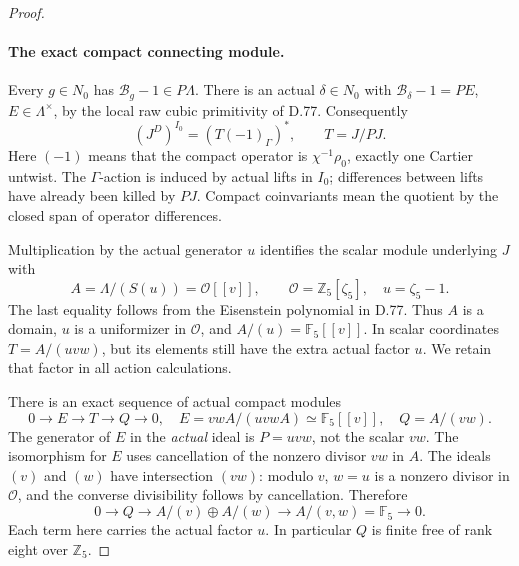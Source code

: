 \begin{proof}
\paragraph{The exact compact connecting module.}
Every \(g\in N_0\) has \(\mathcal B_g-1\in P\Lambda\).
There is an actual \(\delta\in N_0\) with
\(\mathcal B_\delta-1=P E\), \(E\in\Lambda^\times\),
by the local raw cubic primitivity of D.77. Consequently
\[
 (J^D)^{I_0}=(T(-1)_\Gamma)^*,\qquad T=J/PJ.            \tag{D.86.8}
\]
Here \((-1)\) means that the compact operator is
\(\chi^{-1}\rho_0\), exactly one Cartier untwist. The
\(\Gamma\)-action is induced by actual lifts in \(I_0\);
differences between lifts have already been killed by \(PJ\).
Compact coinvariants mean the quotient by the closed span of
operator differences.

Multiplication by the actual generator \(u\) identifies the
scalar module underlying \(J\) with
\[
             A=\Lambda/(S(u))=\mathcal O[[v]],
             \qquad \mathcal O=\mathbb Z_5[\zeta_5],
             \quad u=\zeta_5-1.                       \tag{D.86.9}
\]
The last equality follows from the Eisenstein polynomial in
D.77. Thus \(A\) is a domain, \(u\) is a uniformizer in
\(\mathcal O\), and \(A/(u)=\mathbb F_5[[v]]\).
In scalar coordinates \(T=A/(uvw)\), but its elements still
have the extra actual factor \(u\). We retain that factor in
all action calculations.

There is an exact sequence of actual compact modules
\[
 0\longrightarrow E\longrightarrow T\longrightarrow Q
       \longrightarrow0,
 \quad E=vwA/(uvwA)\simeq\mathbb F_5[[v]],
 \quad Q=A/(vw).                                      \tag{D.86.10}
\]
The generator of \(E\) in the \emph{actual} ideal is \(P=uvw\),
not the scalar \(vw\). The isomorphism for \(E\) uses
cancellation of the nonzero divisor \(vw\) in \(A\).
The ideals \((v)\) and \((w)\) have intersection \((vw)\):
modulo \(v\), \(w=u\) is a nonzero divisor in \(\mathcal O\),
and the converse divisibility follows by cancellation.
Therefore
\[
 0\longrightarrow Q\longrightarrow A/(v)\oplus A/(w)
       \longrightarrow A/(v,w)=\mathbb F_5\longrightarrow0.
                                                               \tag{D.86.11}
\]
Each term here carries the actual factor \(u\). In particular
\(Q\) is finite free of rank eight over \(\mathbb Z_5\).


\end{proof}
